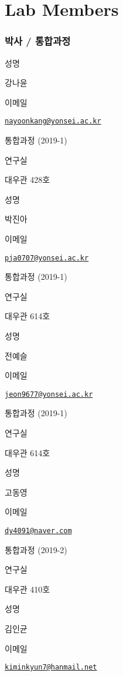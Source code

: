 \documentclass[
]{book}
\begin{document}
\hypertarget{lab-members}{%
\chapter*{Lab Members}\label{lab-members}}

\hypertarget{uxbc15uxc0ac-uxd1b5uxd569uxacfcuxc815}{%
\subsection*{박사 / 통합과정}\label{uxbc15uxc0ac-uxd1b5uxd569uxacfcuxc815}}

성명

강나윤

이메일

\href{mailto:nayoonkang@yonsei.ac.kr}{\nolinkurl{nayoonkang@yonsei.ac.kr}}

통합과정 (2019-1)

연구실

대우관 428호

성명

박진아

이메일

\href{mailto:pja0707@yonsei.ac.kr}{\nolinkurl{pja0707@yonsei.ac.kr}}

통합과정 (2019-1)

연구실

대우관 614호

성명

전예슬

이메일

\href{mailto:jeon9677@yonsei.ac.kr}{\nolinkurl{jeon9677@yonsei.ac.kr}}

통합과정 (2019-1)

연구실

대우관 614호

성명

고동영

이메일

\href{mailto:dy4091@naver.com}{\nolinkurl{dy4091@naver.com}}

통합과정 (2019-2)

연구실

대우관 410호

성명

김인균

이메일

\href{mailto:kiminkyun7@hanmail.net}{\nolinkurl{kiminkyun7@hanmail.net}}
\end{document}
